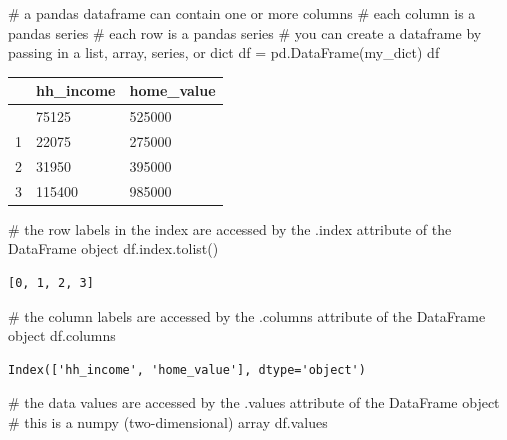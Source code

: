 \documentclass[
  letterpaper,
  DIV=11,
  numbers=noendperiod]{scrreprt}
\newenvironment{Shaded}{\begin{snugshade}}{\end{snugshade}}
\newcommand{\CommentTok}[1]{\textcolor[rgb]{0.37,0.37,0.37}{#1}}
\newcommand{\NormalTok}[1]{\textcolor[rgb]{0.00,0.23,0.31}{#1}}
\newcommand{\OperatorTok}[1]{\textcolor[rgb]{0.37,0.37,0.37}{#1}}
\begin{document}
\begin{Shaded}
\begin{Highlighting}[]
\CommentTok{\# a pandas dataframe can contain one or more columns}
\CommentTok{\# each column is a pandas series}
\CommentTok{\# each row is a pandas series}
\CommentTok{\# you can create a dataframe by passing in a list, array, series, or dict}
\NormalTok{df }\OperatorTok{=}\NormalTok{ pd.DataFrame(my\_dict)}
\NormalTok{df}
\end{Highlighting}
\end{Shaded}

\begin{longtable}[]{@{}lll@{}}
\toprule\noalign{}
& hh\_income & home\_value \\
\midrule\noalign{}
\endhead
\bottomrule\noalign{}
\endlastfoot
0 & 75125 & 525000 \\
1 & 22075 & 275000 \\
2 & 31950 & 395000 \\
3 & 115400 & 985000 \\
\end{longtable}

\begin{Shaded}
\begin{Highlighting}[]
\CommentTok{\# the row labels in the index are accessed by the .index attribute of the DataFrame object}
\NormalTok{df.index.tolist()}
\end{Highlighting}
\end{Shaded}

\begin{verbatim}
[0, 1, 2, 3]
\end{verbatim}

\begin{Shaded}
\begin{Highlighting}[]
\CommentTok{\# the column labels are accessed by the .columns attribute of the DataFrame object}
\NormalTok{df.columns}
\end{Highlighting}
\end{Shaded}

\begin{verbatim}
Index(['hh_income', 'home_value'], dtype='object')
\end{verbatim}

\begin{Shaded}
\begin{Highlighting}[]
\CommentTok{\# the data values are accessed by the .values attribute of the DataFrame object}
\CommentTok{\# this is a numpy (two{-}dimensional) array}
\NormalTok{df.values}
\end{Highlighting}
\end{Shaded}
\end{document}
